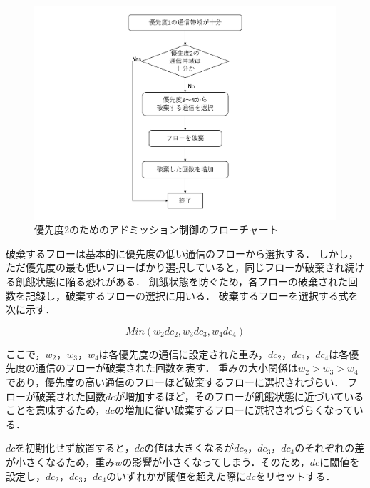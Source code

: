 \documentclass[a4paper,11pt,uplatex]{ujreport}
\begin{document}
  \begin{figure}[!tb]
    \centering
    \includegraphics[width=\linewidth]{img/adomission_p2.pdf}
    \caption{優先度2のためのアドミッション制御のフローチャート}
    \label{fig:adomission2}
  \end{figure}

  破棄するフローは基本的に優先度の低い通信のフローから選択する．
  しかし，ただ優先度の最も低いフローばかり選択していると，同じフローが破棄され続ける飢餓状態に陥る恐れがある．
  飢餓状態を防ぐため，各フローの破棄された回数を記録し，破棄するフローの選択に用いる．
  破棄するフローを選択する式を次に示す．\par

  \begin{equation}
    Min(w_2 dc_2, w_3 dc_3, w_4 dc_4)
  \end{equation}

  ここで，$w_2$，$w_3$，$w_4$は各優先度の通信に設定された重み，$dc_2$，$dc_3$，$dc_4$は各優先度の通信のフローが破棄された回数を表す．
  重みの大小関係は$w_2 > w_3 > w_4$であり，優先度の高い通信のフローほど破棄するフローに選択されづらい．
  フローが破棄された回数$dc$が増加するほど，そのフローが飢餓状態に近づいていることを意味するため，$dc$の増加に従い破棄するフローに選択されづらくなっている．\par

  $dc$を初期化せず放置すると，$dc$の値は大きくなるが$dc_2$，$dc_3$，$dc_4$のそれぞれの差が小さくなるため，重み$w$の影響が小さくなってしまう．そのため，$dc$に閾値を設定し，$dc_2$，$dc_3$，$dc_4$のいずれかが閾値を超えた際に$dc$をリセットする．\par
\end{document}
